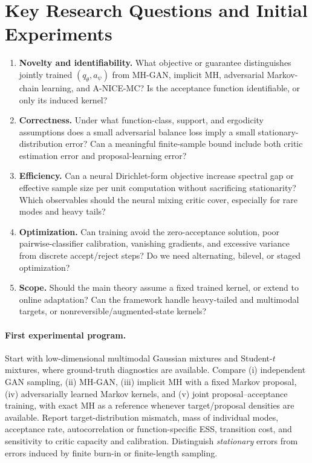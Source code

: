 \documentclass[11pt]{article}
\begin{document}
\section{Key Research Questions and Initial Experiments}
\begin{enumerate}[label=\textbf{Q\arabic*.}]
\item \textbf{Novelty and identifiability.} What objective or guarantee distinguishes jointly trained $(q_\theta,a_\psi)$ from MH-GAN, implicit MH, adversarial Markov-chain learning, and A-NICE-MC? Is the acceptance function identifiable, or only its induced kernel?
\item \textbf{Correctness.} Under what function-class, support, and ergodicity assumptions does a small adversarial balance loss imply a small stationary-distribution error? Can a meaningful finite-sample bound include both critic estimation error and proposal-learning error?
\item \textbf{Efficiency.} Can a neural Dirichlet-form objective increase spectral gap or effective sample size per unit computation without sacrificing stationarity? Which observables should the neural mixing critic cover, especially for rare modes and heavy tails?
\item \textbf{Optimization.} Can training avoid the zero-acceptance solution, poor pairwise-classifier calibration, vanishing gradients, and excessive variance from discrete accept/reject steps? Do we need alternating, bilevel, or staged optimization?
\item \textbf{Scope.} Should the main theory assume a fixed trained kernel, or extend to online adaptation? Can the framework handle heavy-tailed and multimodal targets, or nonreversible/augmented-state kernels?
\end{enumerate}

\paragraph{First experimental program.}
Start with low-dimensional multimodal Gaussian mixtures and Student-$t$ mixtures, where ground-truth diagnostics are available. Compare (i) independent GAN sampling, (ii) MH-GAN, (iii) implicit MH with a fixed Markov proposal, (iv) adversarially learned Markov kernels, and (v) joint proposal--acceptance training, with exact MH as a reference whenever target/proposal densities are available. Report target-distribution mismatch, mass of individual modes, acceptance rate, autocorrelation or function-specific ESS, transition cost, and sensitivity to critic capacity and calibration. Distinguish \emph{stationary} errors from errors induced by finite burn-in or finite-length sampling.
\end{document}
